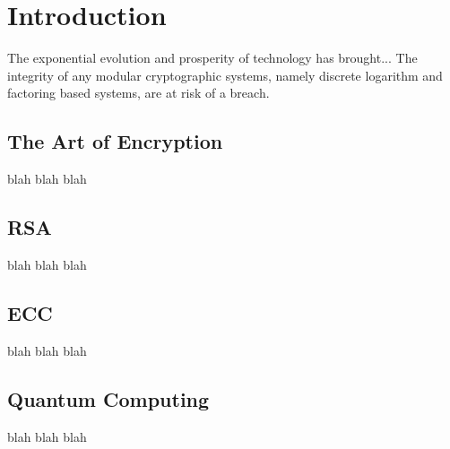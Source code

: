\section{Introduction}
The exponential evolution and prosperity of technology has brought...
The integrity of any modular cryptographic systems, namely discrete logarithm and factoring based systems, are at risk of a breach. 

\subsection{The Art of Encryption}
blah blah blah

\subsection{RSA}
blah blah blah

\subsection{ECC}
blah blah blah

\subsection{Quantum Computing}
blah blah blah